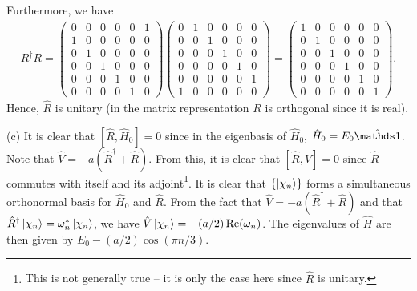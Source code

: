 {Furthermore, we have
\begin{eqnarray}
    R^{\dagger} R = 
   \begin{pmatrix}
        0 & 0 & 0 & 0 & 0 & 1 \\
        1 & 0 & 0 & 0 & 0 & 0 \\
        0 & 1 & 0 & 0 & 0 & 0 \\
        0 & 0 & 1 & 0 & 0 & 0 \\
        0 & 0 & 0 & 1 & 0 & 0 \\
        0 & 0 & 0 & 0 & 1 & 0
    \end{pmatrix}
    \begin{pmatrix}
        0 & 1 & 0 & 0 & 0 & 0 \\
        0 & 0 & 1 & 0 & 0 & 0 \\
        0 & 0 & 0 & 1 & 0 & 0 \\
        0 & 0 & 0 & 0 & 1 & 0 \\
        0 & 0 & 0 & 0 & 0 & 1 \\
        1 & 0 & 0 & 0 & 0 & 0 
    \end{pmatrix}
    = 
    \begin{pmatrix}
        1 & 0 & 0 & 0 & 0 & 0 \\
        0 & 1 & 0 & 0 & 0 & 0 \\
        0 & 0 & 1 & 0 & 0 & 0 \\
        0 & 0 & 0 & 1 & 0 & 0 \\
        0 & 0 & 0 & 0 & 1 & 0 \\
        0 & 0 & 0 & 0 & 0 & 1
    \end{pmatrix}
.\end{eqnarray}
Hence, $\hat{R}$ is unitary (in the matrix representation $R$ is orthogonal since it is real).

(c) It is clear that $[\hat{R},\hat{H}_0] = 0$ since in the eigenbasis of $\hat{H}_{0}$, $\hat{H}_{0} = E_0 \hat{\id}$.
Note that $\hat{V} = -a (\hat{R}^{\dagger} + \hat{R})$.
From this, it is clear that $[\hat{R},V] = 0$ since $\hat{R}$ commutes with itself and its adjoint\footnote{This is not generally true -- it is only the case here since $\hat{R}$ is unitary.}.
It is clear that $\{ \ket{\chi_{n}} \} $ forms a simultaneous orthonormal basis for $\hat{H}_0$ and $\hat{R}$.
From the fact that $\hat{V} = -a( \hat{R}^{\dagger} + \hat{R} )$ and that $\hat{R}^{\dagger} \ket{\chi_{n}} = \omega_{n}^{*} \ket{\chi_{n}}$, we have $\hat{V} \ket{\chi_{n}} = -(a/2) \Re(\omega_{n})$.
The eigenvalues of $\hat{H}$ are then given by $E_0 - (a/2)\cos(\pi n/3)$.

}


